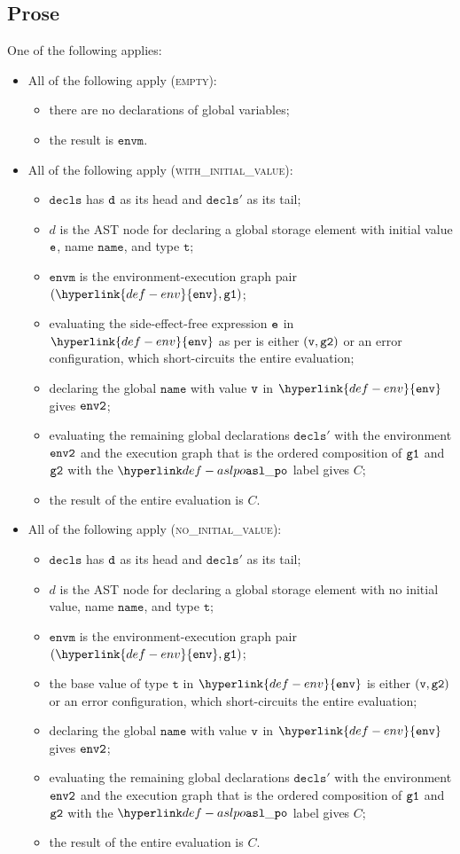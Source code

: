 \documentclass{book}
\newcommand\ProseOrError[0]{or an error configuration, which short-circuits the entire evaluation}
\newcommand\env[0]{\hyperlink{def-env}{\texttt{env}}}
\newcommand\vt[0]{\texttt{t}}
\newcommand\name[0]{\texttt{name}}
\newcommand\envm[0]{\texttt{envm}}
\newcommand\vdecls[0]{\texttt{decls}}
\begin{document}
\subsection{Prose}
One of the following applies:
\begin{itemize}
  \item All of the following apply (\textsc{empty}):
  \begin{itemize}
    \item there are no declarations of global variables;
    \item the result is $\envm$.
  \end{itemize}

  \item All of the following apply (\textsc{with\_initial\_value}):
  \begin{itemize}
    \item $\vdecls$ has $\texttt{d}$ as its head and $\vdecls'$ as its tail;
    \item $d$ is the AST node for declaring a global storage element with initial value $\texttt{e}$,
    name $\name$, and type $\vt$;
    \item $\envm$ is the environment-execution graph pair $(\env, \vgone)$;
    \item evaluating the side-effect-free expression $\texttt{e}$ in $\env$ as per 
    is either $(\texttt{v}, \texttt{g2})$ \ProseOrError;
    \item declaring the global $\name$ with value $\texttt{v}$ in $\env$ gives $\texttt{env2}$;
    \item evaluating the remaining global declarations $\vdecls'$ with the environment $\texttt{env2}$ and the execution graph
    that is the ordered composition of $\texttt{g1}$ and $\texttt{g2}$ with the $\aslpo$ label gives $C$;
    \item the result of the entire evaluation is $C$.
  \end{itemize}

  \item All of the following apply (\textsc{no\_initial\_value}):
  \begin{itemize}
    \item $\vdecls$ has $\texttt{d}$ as its head and $\vdecls'$ as its tail;
    \item $d$ is the AST node for declaring a global storage element with no initial value,
    name $\name$, and type $\vt$;
    \item $\envm$ is the environment-execution graph pair $(\env, \vgone)$;
    \item the base value of type $\vt$ in $\env$ is either $(\texttt{v}, \texttt{g2})$ \ProseOrError;
    \item declaring the global $\name$ with value $\texttt{v}$ in $\env$ gives $\texttt{env2}$;
    \item evaluating the remaining global declarations $\vdecls'$ with the environment $\texttt{env2}$ and the execution graph
    that is the ordered composition of $\texttt{g1}$ and $\texttt{g2}$ with the $\aslpo$ label gives $C$;
    \item the result of the entire evaluation is $C$.
  \end{itemize}
\end{itemize}
\end{document}
